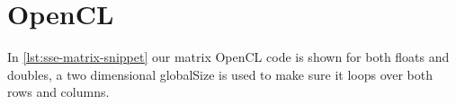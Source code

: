 \documentclass[final]{report}
\begin{document}
\chapter{OpenCL}




In \cref{lst:sse-matrix-snippet} our matrix OpenCL code is shown for both floats and doubles, a two dimensional globalSize is used to make sure it loops over both rows and columns.

\end{document}
